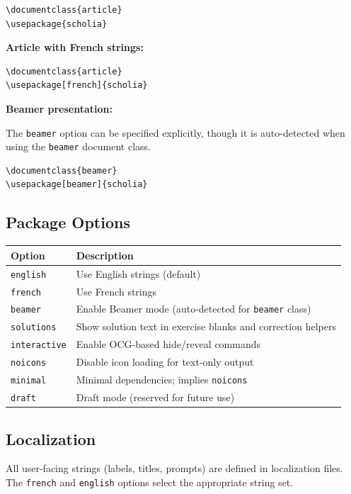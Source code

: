 \documentclass[11pt,a4paper]{article}
\newcommand{\opt}[1]{\texttt{#1}}
\begin{document}
\begin{lstlisting}
\documentclass{article}
\usepackage{scholia}
\end{lstlisting}

\textbf{Article with French strings:}

\begin{lstlisting}
\documentclass{article}
\usepackage[french]{scholia}
\end{lstlisting}

\textbf{Beamer presentation:}

The \opt{beamer} option can be specified explicitly, though it is auto-detected
when using the \texttt{beamer} document class.

\begin{lstlisting}
\documentclass{beamer}
\usepackage[beamer]{scholia}
\end{lstlisting}

\subsection{Package Options}

\begin{tabular}{@{}lp{10cm}@{}}
\toprule
\textbf{Option} & \textbf{Description} \\
\midrule
\opt{english} & Use English strings (default) \\
\opt{french} & Use French strings \\
\opt{beamer} & Enable Beamer mode (auto-detected for \texttt{beamer} class) \\
\opt{solutions} & Show solution text in exercise blanks and correction helpers \\
\opt{interactive} & Enable OCG-based hide/reveal commands \\
\opt{noicons} & Disable icon loading for text-only output \\
\opt{minimal} & Minimal dependencies; implies \opt{noicons} \\
\opt{draft} & Draft mode (reserved for future use) \\
\bottomrule
\end{tabular}

\subsection{Localization}

All user-facing strings (labels, titles, prompts) are defined in localization files.
The \opt{french} and \opt{english} options select the appropriate string set.
\end{document}
